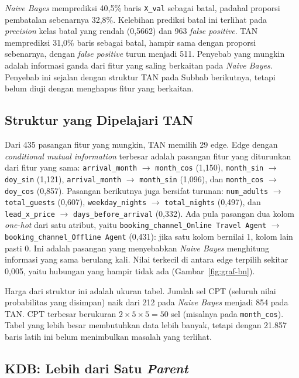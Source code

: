 \textit{Naive Bayes} memprediksi 40,5\% baris \texttt{X\_val} sebagai batal,
padahal proporsi pembatalan sebenarnya 32,8\%. Kelebihan prediksi batal ini
terlihat pada \textit{precision} kelas batal yang rendah (0,5662) dan 963
\textit{false positive}. TAN memprediksi 31,0\% baris sebagai batal, hampir sama
dengan proporsi sebenarnya, dengan \textit{false positive} turun menjadi 511.
Penyebab yang mungkin adalah informasi ganda dari fitur yang saling berkaitan
pada \textit{Naive Bayes}. Penyebab ini sejalan dengan struktur TAN pada
Subbab berikutnya, tetapi belum diuji dengan menghapus fitur yang berkaitan.

\subsection{Struktur yang Dipelajari TAN}

Dari 435 pasangan fitur yang mungkin, TAN memilih 29 edge. Edge dengan
\textit{conditional mutual information} terbesar adalah pasangan fitur yang
diturunkan dari fitur yang sama: \texttt{arrival\_month} $\to$ \texttt{month\_cos}
(1,150), \texttt{month\_sin} $\to$ \texttt{doy\_sin} (1,121),
\texttt{arrival\_month} $\to$ \texttt{month\_sin} (1,096), dan
\texttt{month\_cos} $\to$ \texttt{doy\_cos} (0,857). Pasangan berikutnya juga
bersifat turunan: \texttt{num\_adults} $\to$ \texttt{total\_guests} (0,607),
\texttt{weekday\_nights} $\to$ \texttt{total\_nights} (0,497), dan
\texttt{lead\_x\_price} $\to$ \texttt{days\_before\_arrival} (0,332). Ada pula
pasangan dua kolom \textit{one-hot} dari satu atribut, yaitu
\texttt{booking\_channel\_Online Travel Agent} $\to$
\texttt{booking\_channel\_Offline Agent} (0,431): jika satu kolom bernilai 1,
kolom lain pasti 0. Ini adalah pasangan yang menyebabkan \textit{Naive Bayes}
menghitung informasi yang sama berulang kali. Nilai terkecil di antara edge
terpilih sekitar 0,005, yaitu hubungan yang hampir tidak ada
(Gambar~\ref{fig:graf-bn}).

Harga dari struktur ini adalah ukuran tabel. Jumlah sel CPT (seluruh nilai
probabilitas yang disimpan) naik dari 212 pada \textit{Naive Bayes} menjadi 854
pada TAN. CPT terbesar berukuran
$2\times5\times5=50$ sel (misalnya pada \texttt{month\_cos}).
Tabel yang lebih besar membutuhkan data lebih banyak, tetapi dengan 21.857 baris
latih ini belum menimbulkan masalah yang terlihat.

\subsection{KDB: Lebih dari Satu \textit{Parent}}
\label{sec:hasil-kdb}

